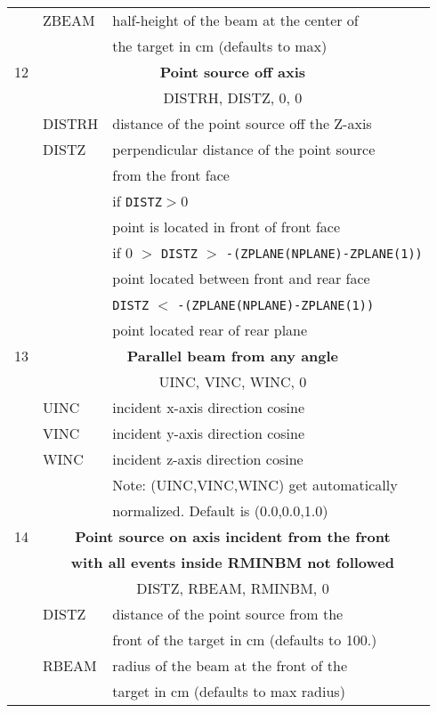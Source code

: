 \begin{longtable}{lll}
  &ZBEAM    & half-height of the beam at the center of\\
  &                & the target in cm (defaults to max)\\
\hline
12&\multicolumn{2}{c}{\bf Point source off axis}\\
  &\multicolumn{2}{c}{      DISTRH, DISTZ, 0, 0}\\
  &DISTRH   & distance of the point source off the Z-axis\\
  &DISTZ    & perpendicular distance of the point source\\
  &                & from the front face\\
  &          &if {\tt DISTZ}$>$0 \\
  &                & point is located in front of front face\\
  & & if 0 $>$ {\tt DISTZ} $>$ {\tt -(ZPLANE(NPLANE)-ZPLANE(1))}\\
  &                & point located between front and rear face\\
  & & {\tt DISTZ} $<$ {\tt -(ZPLANE(NPLANE)-ZPLANE(1))} \\
  &                & point located rear of rear plane \\
\hline
13&\multicolumn{2}{c}{\bf Parallel beam from any angle}\\
  &\multicolumn{2}{c}{      UINC, VINC, WINC, 0}\\
  & UINC    & incident x-axis direction cosine\\
  & VINC    & incident y-axis direction cosine\\
  & WINC    & incident z-axis direction cosine\\
  &         & Note: (UINC,VINC,WINC) get automatically\\
  &         & normalized. Default is (0.0,0.0,1.0)\\
\hline
14&\multicolumn{2}{c}{\bf Point source on axis incident from the front}\\
  &\multicolumn{2}{c}{\bf with all events inside RMINBM not followed} \\
  &\multicolumn{2}{c}{DISTZ, RBEAM, RMINBM, 0}\\
  & DISTZ   &  distance of the point source from the \\
  &         &  front of the target in cm (defaults to 100.)\\
  & RBEAM   &  radius of the beam at the front of the \\
  &         &  target in cm (defaults to max radius)\\

\end{longtable}
